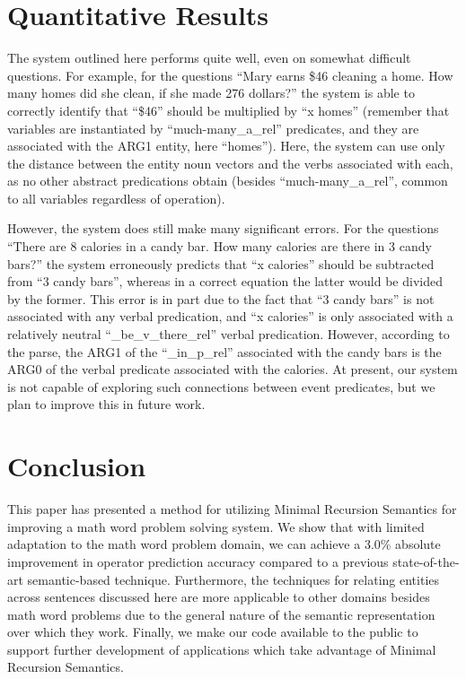 \section{Quantitative Results}
The system outlined here performs quite well, even on somewhat difficult questions.
For example, for the questions ``Mary earns \$46 cleaning a home. How many homes did she clean, if she made 276 dollars?''
the system is able to correctly identify that ``\$46'' should be multiplied by ``x homes'' (remember that variables are instantiated by ``much-many\_a\_rel'' predicates, and they are associated with the ARG1 entity, here ``homes'').
Here, the system can use only the distance between the entity noun vectors and the verbs associated with each, as no other abstract predications obtain (besides ``much-many\_a\_rel'', common to all variables regardless of operation). 

However, the system does still make many significant errors. 
For the questions ``There are 8 calories in a candy bar. How many calories are there in 3 candy bars?'' 
the system erroneously predicts that ``x calories'' should be subtracted from ``3 candy bars'', whereas in a correct equation the latter would be divided by the former. 
This error is in part due to the fact that ``3 candy bars'' is not associated with any verbal predication, and ``x calories'' is only associated with a relatively neutral ``\_be\_v\_there\_rel'' verbal predication. 
However, according to the parse, the ARG1 of the ``\_in\_p\_rel'' associated with the candy bars is the ARG0 of the verbal predicate associated with the calories. 
At present, our system is not capable of exploring such connections between event predicates, but we plan to improve this in future work. 


\section{Conclusion}
This paper has presented a method for utilizing Minimal Recursion Semantics for improving a math word problem solving system. 
We show that with limited adaptation to the math word problem domain, we can achieve a 3.0\% absolute improvement in operator prediction accuracy compared to a previous state-of-the-art semantic-based technique.
Furthermore, the techniques for relating entities across sentences discussed here are more applicable to other domains besides math word problems due to the general nature of the semantic representation over which they work. 
Finally, we make our code available to the public to support further development of applications which take advantage of Minimal Recursion Semantics.
